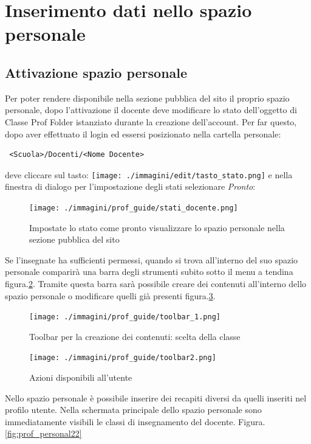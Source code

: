 \section{Inserimento dati nello spazio personale}

\subsection{Attivazione spazio personale}
Per poter rendere disponibile nella sezione pubblica del sito il proprio spazio personale, dopo l'attivazione il docente deve modificare lo stato dell'oggetto di Classe Prof Folder istanziato durante la creazione dell'account.
Per far questo, dopo aver effettuato il login ed essersi posizionato nella cartella personale:
\begin{verbatim}
 <Scuola>/Docenti/<Nome Docente>
\end{verbatim}

deve cliccare sul tasto:
 \texttt{[image: ./immagini/edit/tasto\_stato.png]} 
e nella finestra di dialogo per l'impostazione degli stati selezionare \textsl{Pronto}:
\begin{figure}[H]
 \centering
 \texttt{[image: ./immagini/prof\_guide/stati\_docente.png]}
 \caption{Impostate lo stato come pronto visualizzare lo spazio personale nella sezione pubblica del sito}
 \label{fig:stati_docente}
\end{figure}





Se l'insegnate ha sufficienti permessi, quando si trova all'interno del suo spazio personale comparirà una barra degli strumenti subito sotto il menu a tendina figura.\ref{fig:toolbar_1}. Tramite questa barra sarà possibile creare dei contenuti all'interno dello spazio personale o modificare quelli già presenti figura.\ref{fig:toolbar_2}.

\begin{figure}[H]
 \centering
 \texttt{[image: ./immagini/prof\_guide/toolbar\_1.png]}
 \caption{Toolbar per la creazione dei contenuti: scelta della classe}
 \label{fig:toolbar_1}
\end{figure}

\begin{figure}[H]
 \centering
 \texttt{[image: ./immagini/prof\_guide/toolbar2.png]}
 \caption{Azioni disponibili all'utente}
 \label{fig:toolbar_2}
\end{figure}
Nello spazio personale è possibile inserire dei recapiti diversi da quelli inseriti nel profilo utente. Nella schermata principale dello spazio personale sono immediatamente visibili le classi di insegnamento del docente. Figura.\ref{fig:prof_personal22}

